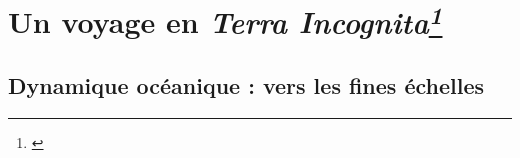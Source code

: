 


\section[Un voyage en \textit{Terra Incognita}]{Un voyage en \textit{Terra Incognita\footnote{\cite{scotti_large_2010}}}}
\subsection{Dynamique océanique : vers les fines échelles}
\label{subsection_intro1}

